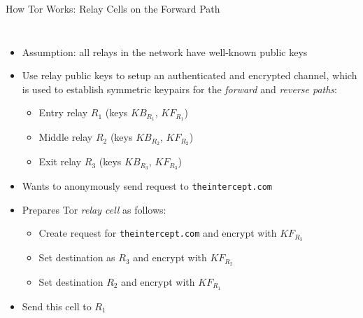 \documentclass[9pt,a4paper,handout]{beamer}
\begin{document}
\begin{frame}{How Tor Works: Relay Cells on the Forward Path}
\begin{columns}
    \begin{itemize}
      \small
      \item Assumption: all relays in the network have well-known public keys
      \item<2-> Use relay public keys to setup an authenticated and encrypted
        channel, which is used to establish symmetric keypairs for the
        \emph{forward} and \emph{reverse paths}:
        \begin{itemize}
          \item Entry relay $R_1$ (keys $KB_{R_1}$, $KF_{R_1}$)
          \item Middle relay $R_2$ (keys $KB_{R_2}$, $KF_{R_2}$)
          \item Exit relay $R_3$ (keys $KB_{R_3}$, $KF_{R_3}$)
        \end{itemize}
      \item<3-> Wants to anonymously send request to \texttt{theintercept.com}
      \item<4-> Prepares Tor \emph{relay cell} as follows:
        \begin{itemize}
          \item<4-> Create request for \texttt{theintercept.com} and encrypt with $KF_{R_3}$
          \item<5-> Set destination as $R_3$ and encrypt with $KF_{R_2}$
          \item<6-> Set destination $R_2$ and encrypt with $KF_{R_1}$
        \end{itemize}
      \item<7-> Send this cell to $R_1$
    \end{itemize}
  \end{columns}
\end{frame}
\end{document}
